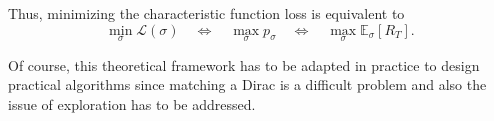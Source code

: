 \documentclass[reqno, 11pt]{amsart}%
\newcommand\cL{\mathcal L}
\newcommand\EE{\mathbb E}
\theoremstyle{definition}
\begin{document}
Thus, minimizing the characteristic function loss is  equivalent to
\[
\min_\sigma \cL(\sigma)
\quad \Longleftrightarrow \quad
\max_\sigma p_\sigma
\quad \Longleftrightarrow \quad
\max_\sigma \mathbb{E}_\sigma[R_T].
\]

Of course, this theoretical framework has to be adapted in practice to design practical algorithms since matching a Dirac is a difficult problem and also the issue of exploration has to be addressed. 

\end{document}
